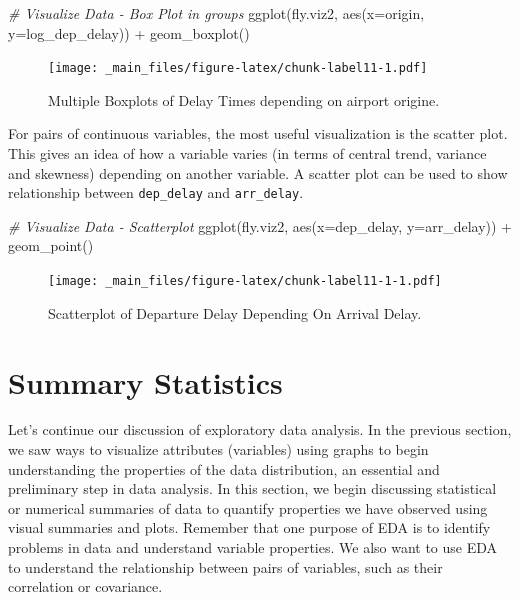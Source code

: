 \documentclass[
]{book}
\newenvironment{Shaded}{\begin{snugshade}}{\end{snugshade}}
\newcommand{\AttributeTok}[1]{\textcolor[rgb]{0.77,0.63,0.00}{#1}}
\newcommand{\CommentTok}[1]{\textcolor[rgb]{0.56,0.35,0.01}{\textit{#1}}}
\newcommand{\FunctionTok}[1]{\textcolor[rgb]{0.00,0.00,0.00}{#1}}
\newcommand{\NormalTok}[1]{#1}
\newcommand{\SpecialCharTok}[1]{\textcolor[rgb]{0.00,0.00,0.00}{#1}}
\begin{document}
\begin{Shaded}
\begin{Highlighting}[]
\CommentTok{\# Visualize Data {-} Box Plot in groups}
\FunctionTok{ggplot}\NormalTok{(fly.viz2, }\FunctionTok{aes}\NormalTok{(}\AttributeTok{x=}\NormalTok{origin, }\AttributeTok{y=}\NormalTok{log\_dep\_delay)) }\SpecialCharTok{+} \FunctionTok{geom\_boxplot}\NormalTok{()}
\end{Highlighting}
\end{Shaded}

\begin{figure}
\centering
\texttt{[image: \_main\_files/figure-latex/chunk-label11-1.pdf]}
\caption{\label{fig:chunk-label11}Multiple Boxplots of Delay Times depending on airport origine.}
\end{figure}

For pairs of continuous variables, the most useful visualization is the scatter plot. This gives an idea of how a variable varies (in terms of central trend, variance and skewness) depending on another variable. A scatter plot can be used to show relationship between \texttt{dep\_delay} and \texttt{arr\_delay}.

\begin{Shaded}
\begin{Highlighting}[]
\CommentTok{\# Visualize Data {-} Scatterplot}
\FunctionTok{ggplot}\NormalTok{(fly.viz2, }\FunctionTok{aes}\NormalTok{(}\AttributeTok{x=}\NormalTok{dep\_delay, }\AttributeTok{y=}\NormalTok{arr\_delay)) }\SpecialCharTok{+} \FunctionTok{geom\_point}\NormalTok{()}
\end{Highlighting}
\end{Shaded}

\begin{figure}
\centering
\texttt{[image: \_main\_files/figure-latex/chunk-label11-1-1.pdf]}
\caption{\label{fig:chunk-label11-1}Scatterplot of Departure Delay Depending On Arrival Delay.}
\end{figure}

\hypertarget{summary-statistics}{%
\section{Summary Statistics}\label{summary-statistics}}

Let's continue our discussion of exploratory data analysis. In the previous section, we saw ways to visualize attributes (variables) using graphs to begin understanding the properties of the data distribution, an essential and preliminary step in data analysis. In this section, we begin discussing statistical or numerical summaries of data to quantify properties we have observed using visual summaries and plots. Remember that one purpose of EDA is to identify problems in data and understand variable properties. We also want to use EDA to understand the relationship between pairs of variables, such as their correlation or covariance.
\end{document}
